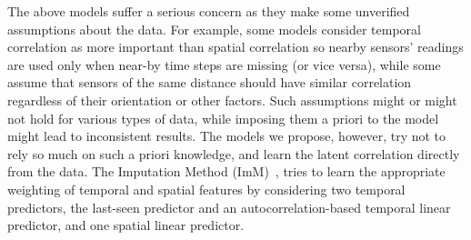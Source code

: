 The above models suffer a serious concern as they make some unverified assumptions about the data. For example, some models consider temporal correlation as more important than spatial correlation so nearby sensors' readings are used only when near-by time steps are missing (or vice versa), while some assume that sensors of the same distance should have similar correlation regardless of their 
orientation or other factors.  Such assumptions might or might not hold for various types of data, while imposing them a priori
to the model might lead to inconsistent results.  The models we propose, however, try not to rely so much on such a priori 
knowledge, and learn the latent correlation directly from the data.  The Imputation Method (ImM)~\cite{Lim:robust}, tries to learn
the appropriate weighting of temporal and spatial features by considering two temporal predictors, the last-seen predictor
and an autocorrelation-based temporal linear predictor, and one spatial linear predictor.


